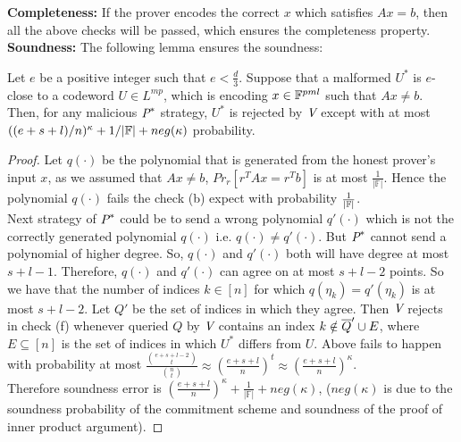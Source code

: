 \textbf{Completeness:} If the prover encodes the correct $x$ which satisfies $Ax=b$, then all the above checks will be passed, which ensures the completeness property.\\

\textbf{Soundness:} The following lemma ensures the soundness:

\begin{lemma}
	Let $e$ be a positive integer such that $e < \frac{d}{3}$. Suppose that a malformed $U^*$ is $e$-close to a codeword $U\in L^{mp}$, which is encoding $x\in \bbF^{pml}$ such that $Ax\neq b$. Then, for any malicious $\P^*$ strategy, $U^*$ is rejected by $\V$ except with at most $((e + s + l)/n) ^{\kappa} +1/|\bbF|+neg(\kappa)$ probability.
\end{lemma}

\begin{proof}
	Let $q(\cdot)$ be the polynomial that is generated from the honest prover's input $x$, as we assumed that $Ax\neq b$, $Pr_r[r^TAx=r^Tb]$ is at most $\frac{1}{|\mathbb{F}|}$. Hence the polynomial $q(\cdot)$ fails the check (b) expect with probability $\frac{1}{|\bbF|}$.\\
	Next strategy of $\P^*$ could be to send a wrong polynomial $q'(\cdot)$ which is not the correctly generated polynomial $q(\cdot)$ i.e. $q(\cdot)\neq q'(\cdot)$. But $\P^*$ cannot send a polynomial of higher degree. So, $q(\cdot)$ and $q'(\cdot)$ both will have degree at most $ s+l-1$. Therefore, $q(\cdot)$ and $q'(\cdot)$ can agree on at most $s+l-2$ points. So we have that the number of indices $k\in[n]$ for which $q(\eta_k)=q'(\eta_k)$ is at most $s+l-2$. Let $Q'$ be the set of indices in which they agree. Then $\V$ rejects in check (f) whenever queried $Q$ by $\V$ contains an index $k\notin \oQ'\cup E$, where $E\subseteq [n]$ is the set of indices in which $U^*$ differs from $U$. Above fails to happen with probability at most $\frac{\binom{e+s+l-2}{t}}{\binom{n}{t}}\approx (\frac{e+s+l}{n})^t\approx (\frac{e+s+l}{n})^{\kappa}$.\\
	Therefore soundness error is $(\frac{e+s+l}{n})^{\kappa}+\frac{1}{|\mathbb{F}|}+neg(\kappa)$, ($neg(\kappa)$ is due to the soundness probability of the commitment scheme and soundness of the proof of inner product argument).
	

\end{proof}
